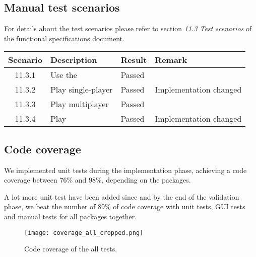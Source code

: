 \subsection{Manual test scenarios}

For details about the test scenarios please refer to section \emph{11.3 Test scenarios} of the functional specifications document.\par

\begin{tabular}{clll}

\hline
	\textbf{Scenario} & \textbf{Description} & \textbf{Result} & \textbf{Remark} \\
	\hline
	11.3.1 & Use the \gameexplorer & Passed & \\
	11.3.2 & Play \graphcoloring single-player & Passed & Implementation changed \footnotemark \\
	11.3.3 & Play \graphcoloring multiplayer & Passed & \\
	11.3.4 & Play \twixt & Passed & Implementation changed \footnotemark \\
	\hline
\end{tabular}


\pagebreak
\subsection{Code coverage}
\label{section:code-coverage}
We implemented unit tests during the implementation phase, achieving a code coverage between 76\% and 98\%, depending on the packages.\par
A lot more unit test have been added since and by the end of the validation phase, we beat the number of 89\% of code coverage with unit tests, GUI tests and manual tests for all packages together.\par

\begin{figure}[!h]
	\centering
	\texttt{[image: coverage\_all\_cropped.png]}
	\caption{Code coverage of the all tests.}
	\label{img:codeCoverage}
\end{figure}
